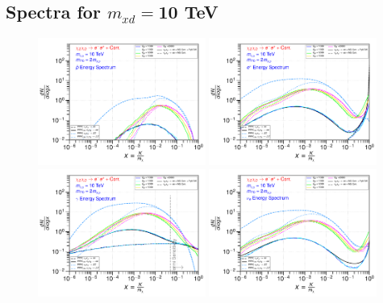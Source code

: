 \documentclass[epj,nopacs,fleqn]{svjour}
\begin{document}
\subsection{Spectra for $m_{xd}=$10 TeV}
\begin{figure}[!h]
	\centering
	\subfigure
	{ \includegraphics[width=0.49\textwidth]{Fig/xdxd_ee_eeZ_eveW/10_antiprotons_ee_eeZ_eveW_10.pdf}}
	\subfigure
	{ \includegraphics[width=0.49\textwidth]{Fig/xdxd_ee_eeZ_eveW/10_positrons_ee_eeZ_eveW_10.pdf}}
	\subfigure
	{ \includegraphics[width=0.49\textwidth]{Fig/xdxd_ee_eeZ_eveW/10_gammas_ee_eeZ_eveW_10.pdf}}
	\subfigure
	{ \includegraphics[width=0.49\textwidth]{Fig/xdxd_ee_eeZ_eveW/10_neutrinos_e_ee_eeZ_eveW_10.pdf}}

\end{figure}
\end{document}
